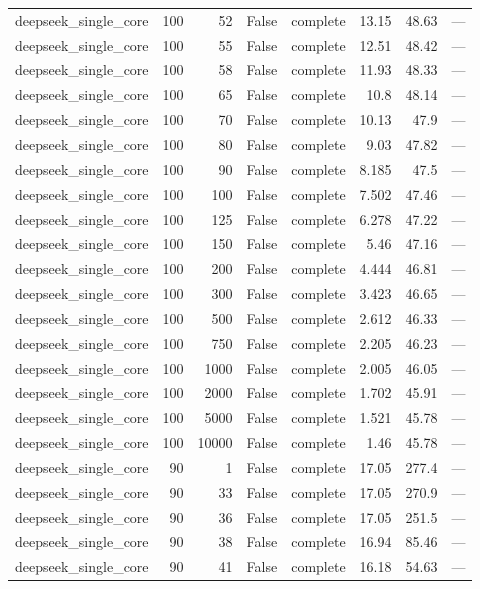 \begin{tabular}{lrrrlrrl}
deepseek\_single\_core & 100 & 52 & False & complete & 13.15 & 48.63 & — \\
deepseek\_single\_core & 100 & 55 & False & complete & 12.51 & 48.42 & — \\
deepseek\_single\_core & 100 & 58 & False & complete & 11.93 & 48.33 & — \\
deepseek\_single\_core & 100 & 65 & False & complete & 10.8 & 48.14 & — \\
deepseek\_single\_core & 100 & 70 & False & complete & 10.13 & 47.9 & — \\
deepseek\_single\_core & 100 & 80 & False & complete & 9.03 & 47.82 & — \\
deepseek\_single\_core & 100 & 90 & False & complete & 8.185 & 47.5 & — \\
deepseek\_single\_core & 100 & 100 & False & complete & 7.502 & 47.46 & — \\
deepseek\_single\_core & 100 & 125 & False & complete & 6.278 & 47.22 & — \\
deepseek\_single\_core & 100 & 150 & False & complete & 5.46 & 47.16 & — \\
deepseek\_single\_core & 100 & 200 & False & complete & 4.444 & 46.81 & — \\
deepseek\_single\_core & 100 & 300 & False & complete & 3.423 & 46.65 & — \\
deepseek\_single\_core & 100 & 500 & False & complete & 2.612 & 46.33 & — \\
deepseek\_single\_core & 100 & 750 & False & complete & 2.205 & 46.23 & — \\
deepseek\_single\_core & 100 & 1000 & False & complete & 2.005 & 46.05 & — \\
deepseek\_single\_core & 100 & 2000 & False & complete & 1.702 & 45.91 & — \\
deepseek\_single\_core & 100 & 5000 & False & complete & 1.521 & 45.78 & — \\
deepseek\_single\_core & 100 & 10000 & False & complete & 1.46 & 45.78 & — \\
deepseek\_single\_core & 90 & 1 & False & complete & 17.05 & 277.4 & — \\
deepseek\_single\_core & 90 & 33 & False & complete & 17.05 & 270.9 & — \\
deepseek\_single\_core & 90 & 36 & False & complete & 17.05 & 251.5 & — \\
deepseek\_single\_core & 90 & 38 & False & complete & 16.94 & 85.46 & — \\
deepseek\_single\_core & 90 & 41 & False & complete & 16.18 & 54.63 & — \\

\end{tabular}

